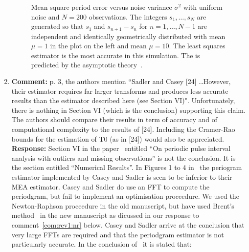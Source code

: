 \documentclass[a4paper,10pt]{article}
\begin{document}
\begin{enumerate}
\begin{figure*}[tp]
  \caption{Mean square period error versus noise variance $\sigma^2$ with uniform noise and $N=200$ observations.  The integers $s_1,\dots,s_N$ are generated so that $s_1$ and $s_{n+1} - s_n$ for $n=1,\dots,N-1$ are independent and identically geometrically distributed with mean $\mu = 1$ in the plot on the left and mean $\mu=10$.  The least squares estimator is the most accurate in this simulation. The is predicted by the asymptotic theory~\cite{Quinn_sparse_noisy_SSP_2012,Quinn20013asilomar_period_est}.}\label{plot:geomuniform}
\end{figure*} 


\item\textbf{Comment:}
p. 3, the authors mention “Sadler and Casey [24] \dots However, their estimator
requires far larger transforms and produces less accurate results than the estimator
described here (see Section VI)". Unfortunately, there is nothing in
Section VI (which is the conclusion) supporting this claim. The authors should
compare their results in term of accuracy and of computational complexity to
the results of [24]. Including the Cramer-Rao bounds for the estimation of T0
(as in [24]) would also be appreciated.
\\
\textbf{Response:}
Section VI in the paper~\cite{726812} entitled ``On periodic pulse interval analysis with outliers and missing observations'' is not the conclusion.  It is the section entitled ``Numerical Results''.  In Figures 1 to 4 in~\cite{726812} the periogram estimator implemented by Casey and Sadler is seen to be inferior to their MEA estimator.  Casey and Sadler do use an FFT to compute the periodgram, but fail to implement an optimisation proceedure.  We used the Newton-Raphson proceedure in the old manuscript, but have used Brent's method~\cite{Brent_opt_no_derivs_1973} in the new manuscript as dicussed in our response to comment~\ref{com:rev1:nr} below.  Casey and Sadler arrive at the conclusion that very large FFTs are required and that the periodgram estimator is not particularly accurate.  In the conclusion of~\cite{726812} it is stated that:


\end{enumerate}
\end{document}
